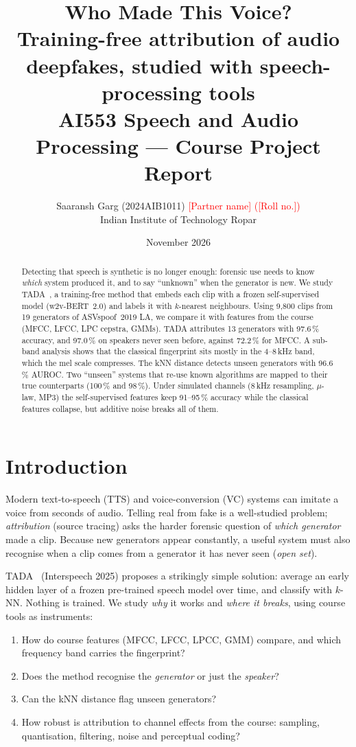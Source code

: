 \documentclass[11pt,a4paper]{article}
\title{\vspace{-1.4cm}\textbf{Who Made This Voice?}\\[3pt]
\large Training-free attribution of audio deepfakes, studied with speech-processing tools\\[6pt]
\normalsize AI553 Speech and Audio Processing --- Course Project Report}
\author{Saaransh Garg (2024AIB1011) \quad \textcolor{red}{[Partner name] ([Roll no.])}\\
\small Indian Institute of Technology Ropar}
\date{November 2026}
\begin{document}
\maketitle

\begin{abstract}
\noindent Detecting that speech is synthetic is no longer enough: forensic use needs to know
\emph{which} system produced it, and to say ``unknown'' when the generator is new. We study
TADA~\cite{stan2025tada}, a training-free method that embeds each clip with a frozen
self-supervised model (w2v-BERT~2.0) and labels it with $k$-nearest neighbours. Using 9{,}800
clips from 19 generators of ASVspoof~2019 LA, we compare it with features from the course
(MFCC, LFCC, LPC cepstra, GMMs). TADA attributes 13 generators with 97.6\,\% accuracy, and
97.0\,\% on speakers never seen before, against 72.2\,\% for MFCC. A sub-band analysis shows
that the classical fingerprint sits mostly in the 4--8\,kHz band, which the mel scale
compresses. The kNN distance detects unseen generators with 96.6\,\% AUROC. Two
``unseen'' systems that re-use known algorithms are mapped to their true counterparts
(100\,\% and 98\,\%). Under simulated channels (8\,kHz resampling, $\mu$-law, MP3) the
self-supervised features keep 91--95\,\% accuracy while the classical features collapse,
but additive noise breaks all of them.
\end{abstract}

\section{Introduction}
Modern text-to-speech (TTS) and voice-conversion (VC) systems can imitate a voice from
seconds of audio. Telling real from fake is a well-studied problem; \emph{attribution}
(source tracing) asks the harder forensic question of \emph{which generator} made a clip.
Because new generators appear constantly, a useful system must also recognise when a clip
comes from a generator it has never seen (\emph{open set}).

TADA~\cite{stan2025tada} (Interspeech 2025) proposes a strikingly simple solution: average
an early hidden layer of a frozen pre-trained speech model over time, and classify with
$k$-NN. Nothing is trained. We study \emph{why} it works and \emph{where it breaks}, using
course tools as instruments:
\begin{enumerate}[label=\textbf{RQ\arabic*},leftmargin=3em,itemsep=0pt]
  \item How do course features (MFCC, LFCC, LPCC, GMM) compare, and which frequency band
        carries the fingerprint?
  \item Does the method recognise the \emph{generator} or just the \emph{speaker}?
  \item Can the kNN distance flag unseen generators?
  \item How robust is attribution to channel effects from the course: sampling,
        quantisation, filtering, noise and perceptual coding?
\end{enumerate}
\end{document}
